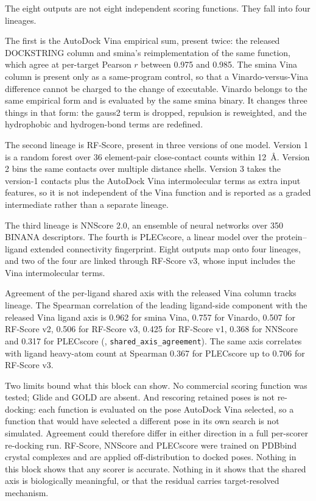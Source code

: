 The eight outputs are not eight independent scoring functions. They fall into four lineages.

The first is the AutoDock Vina empirical sum, present twice: the released DOCKSTRING column
and smina's reimplementation of the same function, which agree at per-target Pearson $r$
between 0.975 and 0.985. The smina Vina column is present only as a same-program control, so
that a Vinardo-versus-Vina difference cannot be charged to the change of executable. Vinardo
belongs to
the same empirical form and is evaluated by the same smina binary. It changes three things in
that form: the gauss2 term is dropped, repulsion is reweighted, and the hydrophobic and
hydrogen-bond terms are redefined.

The second lineage is RF-Score, present in three versions of one model. Version 1 is a random
forest over 36 element-pair close-contact counts within 12~\AA{}. Version 2 bins the same
contacts over multiple distance shells. Version 3 takes the version-1 contacts plus the
AutoDock Vina intermolecular terms as extra input features, so it is not independent of the
Vina function and is reported as a graded intermediate rather than a separate lineage.

The third lineage is NNScore 2.0, an ensemble of neural networks over 350 BINANA descriptors.
The fourth is PLECscore, a linear model over the protein--ligand extended connectivity
fingerprint. Eight outputs map onto four lineages, and two of the four are linked through
RF-Score v3, whose input includes the Vina intermolecular terms.

Agreement of the per-ligand shared axis with the released Vina column tracks lineage. The
Spearman correlation of the leading ligand-side component with the released Vina ligand axis is
0.962 for smina Vina, 0.757 for Vinardo, 0.507 for RF-Score v2, 0.506 for RF-Score v3, 0.425
for RF-Score v1, 0.368 for NNScore and 0.317 for PLECscore
(, \texttt{shared\_axis\_agreement}). The same axis correlates with ligand
heavy-atom count at Spearman 0.367 for PLECscore up to 0.706 for RF-Score v3.

Two limits bound what this block can show. No commercial scoring function was tested; Glide and
GOLD are absent. And rescoring retained poses is not re-docking: each function is evaluated on
the pose AutoDock Vina selected, so a function that would have selected a different pose in its
own search is not simulated. Agreement could therefore differ in either direction in a full
per-scorer re-docking run. RF-Score, NNScore and PLECscore were trained on
PDBbind crystal complexes and are applied off-distribution to docked poses. Nothing in this
block shows that any scorer is accurate. Nothing in it shows that the shared axis is
biologically meaningful, or that the residual carries target-resolved mechanism.
